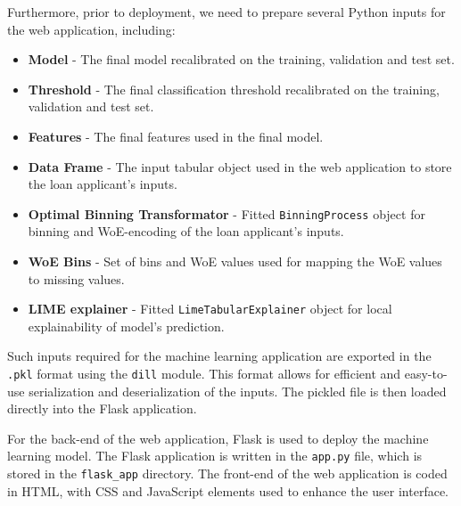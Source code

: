 Furthermore, prior to deployment, we need to prepare several Python inputs for the web application, including:
\begin{itemize}\setlength\itemsep{0em}
\item \textbf{Model} - The final model recalibrated on the training, validation and test set.
\item \textbf{Threshold} - The final classification threshold recalibrated on the training, validation and test set.
\item \textbf{Features} - The final features used in the final model.
\item \textbf{Data Frame} - The input tabular object used in the web application to store the loan applicant's inputs.
\item \textbf{Optimal Binning Transformator} - Fitted \lstinline{BinningProcess} object for binning and WoE-encoding of the loan applicant's inputs.
\item \textbf{WoE Bins} - Set of bins and WoE values used for mapping the WoE values to missing values.
\item \textbf{LIME explainer} - Fitted \lstinline{LimeTabularExplainer} object for local explainability of model's prediction.
\end{itemize}

Such inputs required for the machine learning application are exported in the \lstinline{.pkl} format using the \lstinline{dill} module. This format allows for efficient and easy-to-use serialization and deserialization of the inputs. The pickled file is then loaded directly into the Flask application.

For the back-end of the web application, Flask is used to deploy the machine learning model. The Flask application is written in the \lstinline{app.py} file, which is stored in the \lstinline{flask_app} directory. The front-end of the web application is coded in HTML, with CSS and JavaScript elements used to enhance the user interface.

